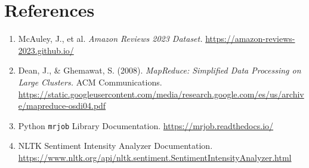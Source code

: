 \documentclass[12pt, a4paper]{article}
\begin{document}
	\section*{References}
	\begin{enumerate}
		\item McAuley, J., et al. \textit{Amazon Reviews 2023 Dataset.} \url{https://amazon-reviews-2023.github.io/}
		\item Dean, J., \& Ghemawat, S. (2008). \textit{MapReduce: Simplified Data Processing on Large Clusters.} ACM Communications. \url{https://static.googleusercontent.com/media/research.google.com/es/us/archive/mapreduce-osdi04.pdf}
		\item Python \texttt{mrjob} Library Documentation. \url{https://mrjob.readthedocs.io/}
		\item NLTK Sentiment Intensity Analyzer Documentation. \url{https://www.nltk.org/api/nltk.sentiment.SentimentIntensityAnalyzer.html}
	\end{enumerate}
	
\end{document}
